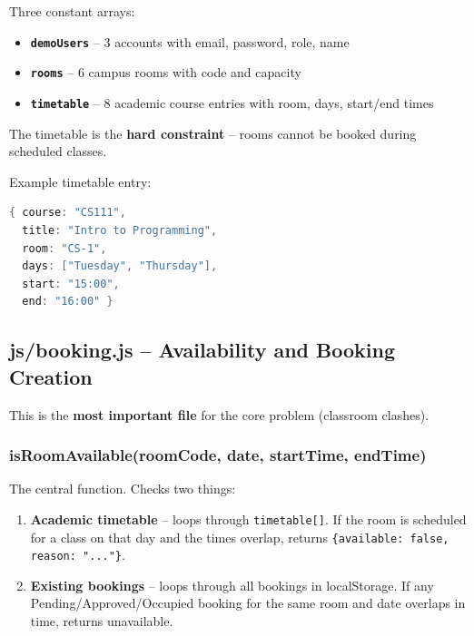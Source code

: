 \documentclass[12pt,a4paper]{article}
\begin{document}
Three constant arrays:

\begin{itemize}
  \item \textbf{\texttt{demoUsers}} -- 3 accounts with email, password, role, name
  \item \textbf{\texttt{rooms}} -- 6 campus rooms with code and capacity
  \item \textbf{\texttt{timetable}} -- 8 academic course entries with room, days, start/end times
\end{itemize}

The timetable is the \textbf{hard constraint} -- rooms cannot be booked during scheduled classes.

Example timetable entry:
\begin{lstlisting}[language=Java]
{ course: "CS111",
  title: "Intro to Programming",
  room: "CS-1",
  days: ["Tuesday", "Thursday"],
  start: "15:00",
  end: "16:00" }
\end{lstlisting}

\subsection{js/booking.js -- Availability and Booking Creation}

This is the \textbf{most important file} for the core problem (classroom clashes).

\subsubsection{isRoomAvailable(roomCode, date, startTime, endTime)}

The central function. Checks two things:

\begin{enumerate}
  \item \textbf{Academic timetable} -- loops through \texttt{timetable[]}. If the room is scheduled for a class on that day and the times overlap, returns \texttt{\{available: false, reason: "..."\}}.
  \item \textbf{Existing bookings} -- loops through all bookings in localStorage. If any Pending/Approved/Occupied booking for the same room and date overlaps in time, returns unavailable.
\end{enumerate}
\end{document}
